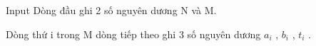Input
Dòng đầu ghi 2 số nguyên dương N và M.

Dòng thứ i trong M dòng tiếp theo ghi 3 số nguyên dương $a_{i}$ , $b_{i}$ , $t_{i}$ .